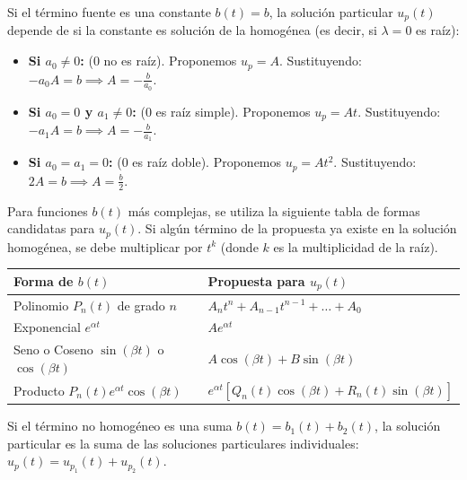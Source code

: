 Si el término fuente es una constante $b(t) = b$, la solución particular $u_p(t)$ depende de si la constante es solución de la homogénea (es decir, si $\lambda=0$ es raíz):

\begin{itemize}
    \item \textbf{Si $a_0 \neq 0$:} ($0$ no es raíz). Proponemos $u_p = A$. Sustituyendo: $-a_0 A = b \implies A = -\frac{b}{a_0}$.
    \item \textbf{Si $a_0 = 0$ y $a_1 \neq 0$:} ($0$ es raíz simple). Proponemos $u_p = At$. Sustituyendo: $-a_1 A = b \implies A = -\frac{b}{a_1}$.
    \item \textbf{Si $a_0 = a_1 = 0$:} ($0$ es raíz doble). Proponemos $u_p = At^2$. Sustituyendo: $2A = b \implies A = \frac{b}{2}$.
\end{itemize}

Para funciones $b(t)$ más complejas, se utiliza la siguiente tabla de formas candidatas para $u_p(t)$. Si algún término de la propuesta ya existe en la solución homogénea, se debe multiplicar por $t^k$ (donde $k$ es la multiplicidad de la raíz).

\begin{table}[h]
\centering
\renewcommand{\arraystretch}{1.5}
\begin{tabular}{|l|l|}
\hline
\textbf{Forma de $b(t)$} & \textbf{Propuesta para $u_p(t)$} \\ \hline
Polinomio $P_n(t)$ de grado $n$ & $A_n t^n + A_{n-1} t^{n-1} + \dots + A_0$ \\ \hline
Exponencial $e^{\alpha t}$ & $A e^{\alpha t}$ \\ \hline
Seno o Coseno $\sin(\beta t)$ o $\cos(\beta t)$ & $A \cos(\beta t) + B \sin(\beta t)$ \\ \hline
Producto $P_n(t) e^{\alpha t} \cos(\beta t)$ & $e^{\alpha t} \left[ Q_n(t) \cos(\beta t) + R_n(t) \sin(\beta t) \right]$ \\ \hline
\end{tabular}
\end{table}

Si el término no homogéneo es una suma $b(t) = b_1(t) + b_2(t)$, la solución particular es la suma de las soluciones particulares individuales: $u_p(t) = u_{p_1}(t) + u_{p_2}(t)$.

